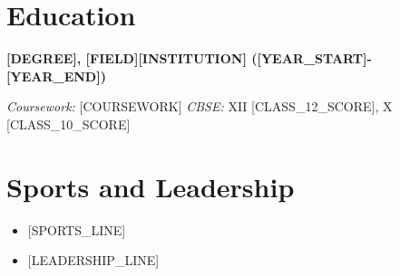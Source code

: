 \documentclass[10pt,a4paper]{article}
\newcommand{\eduentry}[2]{\textbf{#1}\hspace{2em}\hfill\textbf{#2}\par}
\begin{document}
\section{Education}
\eduentry{[DEGREE], [FIELD]}{[INSTITUTION] ([YEAR_START]-[YEAR_END])}
\textit{Coursework:} [COURSEWORK] \hspace{2em}\hfill \textit{CBSE:} XII [CLASS_12_SCORE], X [CLASS_10_SCORE]

\section{Sports and Leadership}
\begin{itemize}
  \item {[SPORTS_LINE]}
  \item {[LEADERSHIP_LINE]}
\end{itemize}
\end{document}
